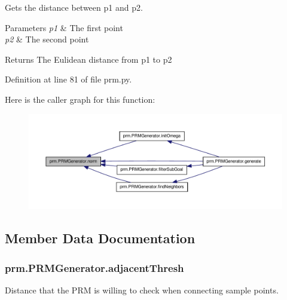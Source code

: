 Gets the distance between p1 and p2. 


\begin{DoxyParams}{Parameters}
{\em p1} & The first point \\
\hline
{\em p2} & The second point \\
\hline
\end{DoxyParams}
\begin{DoxyReturn}{Returns}
The Eulidean distance from p1 to p2 
\end{DoxyReturn}


Definition at line 81 of file prm.\-py.



Here is the caller graph for this function\-:\nopagebreak
\begin{figure}[H]
\begin{center}
\leavevmode
\includegraphics[width=350pt]{classprm_1_1PRMGenerator_a652b3c0fa11645f351c23635d7e62dda_icgraph}
\end{center}
\end{figure}




\subsection{Member Data Documentation}
\hypertarget{classprm_1_1PRMGenerator_aa56ad4365534ffed0b4311c5accce577}{
\subsubsection[{adjacent\-Thresh}]{\setlength{\rightskip}{0pt plus 5cm}prm.\-P\-R\-M\-Generator.\-adjacent\-Thresh}}\label{classprm_1_1PRMGenerator_aa56ad4365534ffed0b4311c5accce577}


Distance that the P\-R\-M is willing to check when connecting sample points. 




